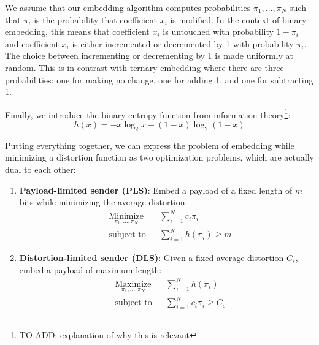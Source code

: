 \documentclass[11pt,a4paper,twoside,openright]{report}
\begin{document}
We assume that our embedding algorithm computes probabilities $\pi_1,...,\pi_N$ such that $\pi_i$ is the probability that coefficient $x_i$ is modified. In the context of binary embedding, this means that coefficient $x_i$ is untouched with probability $1-\pi_i$ and coefficient $x_i$ is either incremented or decremented by 1 with probability $\pi_i$. The choice between incrementing or decrementing by 1 is made uniformly at random. This is in contrast with ternary embedding where there are three probabilities: one for making no change, one for adding 1, and one for subtracting 1.

Finally, we introduce the binary entropy function from information theory\footnote{TO ADD: explanation of why this is relevant}:
\begin{equation*}
	h(x) = -x \log_2 x - (1-x) \log_2{(1-x)}
\end{equation*}

Putting everything together, we can express the problem of embedding while minimizing a distortion function as two optimization problems, which are actually dual to each other:
\begin{enumerate}

	\item \textbf{Payload-limited sender (PLS)}: Embed a payload of a fixed length of $m$ bits while minimizing the average distortion:
		\begin{equation*}
			\begin{aligned}
			& \underset{\pi_1,...,\pi_N}{\text{Minimize}}
			& & \sum_{i=1}^{N} c_i \pi_i \\
			& \text{subject to}
			& & \sum_{i=1}^{N} h(\pi_i) \geq m
			\end{aligned}
		\end{equation*}

	\item \textbf{Distortion-limited sender (DLS)}: Given a fixed average distortion $C_{\epsilon}$, embed a payload of maximum length:
		\begin{equation*}
			\begin{aligned}
			& \underset{\pi_1,...,\pi_N}{\text{Maximize}}
			& & \sum_{i=1}^{N} h(\pi_i) \\
			& \text{subject to}
			& & \sum_{i=1}^{N} c_i \pi_i \geq C_{\epsilon}
			\end{aligned}
		\end{equation*}

\end{enumerate}
\end{document}
